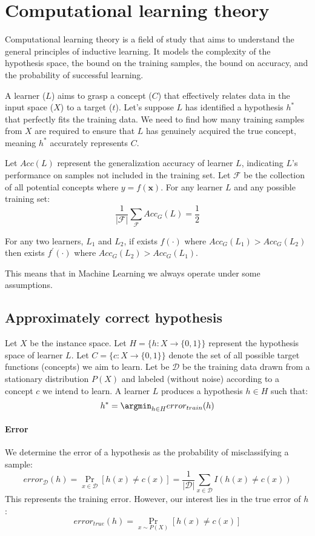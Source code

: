 \section{Computational learning theory}

Computational learning theory is a field of study that aims to understand the general principles of inductive learning. 
It models the complexity of the hypothesis space, the bound on the training samples, the bound on accuracy, and the probability of successful learning.

A learner ($L$) aims to grasp a concept ($C$) that effectively relates data in the input space ($X$) to a target ($t$). 
Let's suppose $L$ has identified a hypothesis $h^\ast$ that perfectly fits the training data.
We need to find how many training samples from $X$ are required to ensure that $L$ has genuinely acquired the true concept, meaning $h^\ast$ accurately represents $C$. 

Let $Acc(L)$ represent the generalization accuracy of learner $L$, indicating $L$'s performance on samples not included in the training set.
Let $\mathcal{F}$ be the collection of all potential concepts where $y = f(\mathbf{x})$.
For any learner $L$ and any possible training set:
\[\dfrac{1}{\left\lvert \mathcal{F} \right\rvert}\sum_{\mathcal{F}}Acc_G(L)=\dfrac{1}{2}\]
\begin{corollary}
    For any two learners, $L_1$ and $L_2$, if exists $f(\cdot)$ where $Acc_G(L_1)>Acc_G(L_2)$ then exists $f^\prime(\cdot)$ where $Acc_G(L_2)>Acc_G(L_1)$. 
\end{corollary}
This means that in Machine Learning we always operate under some assumptions. 

\subsection{Approximately correct hypothesis}
Let $X$ be the instance space.
Let $H =\{ h:X \rightarrow \{0,1\}\}$ represent the hypothesis space of learner $L$. 
Let $C =\{ c:X \rightarrow \{0,1\}\}$ denote the set of all possible target functions (concepts) we aim to learn.
Let be $\mathcal{D}$ be the training data drawn from a stationary distribution $P(X)$ and labeled (without noise) according to a concept $c$ we intend to learn.
A learner $L$ produces a hypothesis $h \in H$ such that: 
\[h^\ast=\argmin_{h\in H}error_{train}(h)\]

\paragraph*{Error}
We determine the error of a hypothesis as the probability of misclassifying a sample:
\[error_{\mathcal{D}}(h)=\Pr_{x\in\mathcal{D}}\left[h(x)\neq c(x)\right]=\dfrac{1}{\left\lvert \mathcal{D}\right\rvert}\sum_{x\in\mathcal{D}}I(h(x)\neq c(x))\]
This represents the training error. 
However, our interest lies in the true error of $h$:
\[error_{true}(h)=\Pr_{x \sim P(X)}\left[h(x)\neq c(x)\right]\]

